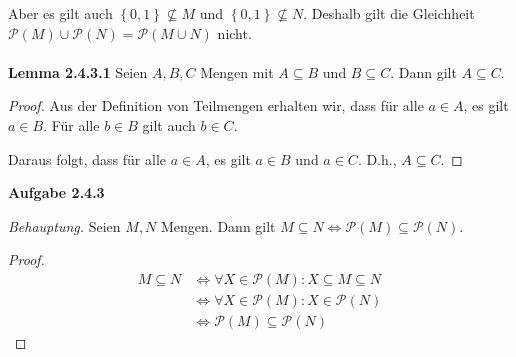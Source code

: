 \documentclass[12pt]{extarticle}
\begin{document}
  Aber es gilt auch \(\left\{ 0,1 \right\} \nsubseteq M\) und
  \(\left\{ 0,1 \right\} \nsubseteq N\).  Deshalb gilt die Gleichheit
  \(\mathcal{P}(M) \cup \mathcal{P}(N) = \mathcal{P}(M \cup N)\) nicht.
\\\\
\textbf{Lemma 2.4.3.1}  Seien \(A, B, C\) Mengen mit \(A \subseteq B\) und
\(B \subseteq C\).  Dann gilt \(A \subseteq C\).

\begin{proof}
  Aus der Definition von Teilmengen erhalten wir, dass für alle $a \in
  A$, es gilt \(a \in B\).  Für alle \(b \in B\) gilt auch \(b \in C\).

  Daraus folgt, dass für alle \(a \in A\), es gilt \(a \in B\) und
  \(a \in C\).  D.h., \(A \subseteq C\).
  \end{proof}

\textbf{Aufgabe 2.4.3}

\textit{Behauptung.}  Seien \(M, N\) Mengen.  Dann gilt
\(M \subseteq N \iff \mathcal{P}(M) \subseteq \mathcal{P}(N)\).
\begin{proof}
\begin{align*}
  M \subseteq N
  &\iff \forall X \in \mathcal{P}(M): X \subseteq M \subseteq N
    \tag*{Lemma 2.4.3.1}\\
  &\iff \forall X \in \mathcal{P}(M): X \in \mathcal{P}(N)
    \tag*{Definition von Potenzmengen}\\
  &\iff \mathcal{P}(M) \subseteq \mathcal{P}(N)
    \tag*{Definition von Teilmengen}
\end{align*}
\end{proof}
\end{document}

